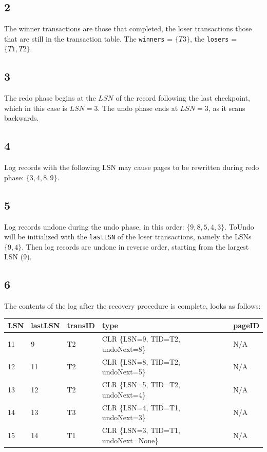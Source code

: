 \subsection*{2}
The winner transactions are those that completed, the loser transactions those
that are still in the transaction table. The \texttt{winners} = $\{T3\}$, the
\texttt{losers} = $\{T1,T2\}$.

\subsection*{3}
The redo phase begins at the $LSN$ of the record following the last checkpoint,
which in this case is $LSN=3$. The undo phase ends at $LSN=3$, as it scans
backwards.
\subsection*{4}
Log records with the following LSN may cause pages to be rewritten during redo
phase: $\{3, 4, 8, 9\}$.
\subsection*{5}
Log records undone during the undo phase, in this order: $\{9,8,5,4,3\}$. ToUndo
will be initialized with the \texttt{lastLSN} of the loser transactions, namely
the LSNs $\{9, 4\}$. Then log records are undone in reverse order, starting from
the largest LSN (9).
\subsection*{6}
The contents of the log after the recovery procedure is complete, looks as
follows:

\begin{table}[h!]
    \begin{tabular}{|l|l|l|l|l|}
        \hline
        LSN & lastLSN & transID & type & pageID \\ \hline
        11 & 9 & T2 & CLR \{LSN=9, TID=T2, undoNext=8\} & N/A \\ \hline
        12 & 11 & T2 & CLR \{LSN=8, TID=T2, undoNext=5\} & N/A \\ \hline
        13 & 12 & T2 & CLR \{LSN=5, TID=T2, undoNext=4\} & N/A \\ \hline
        14 & 13 & T3 & CLR \{LSN=4, TID=T1, undoNext=3\} & N/A \\ \hline
        15 & 14 & T1 & CLR \{LSN=3, TID=T1, undoNext=None\} & N/A \\ \hline
    \end{tabular}
\end{table}

